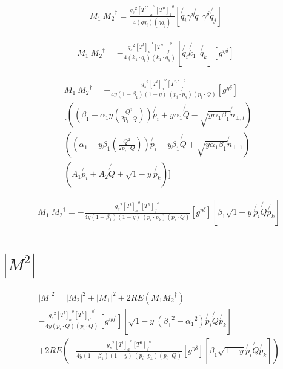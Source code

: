 \begin{equation}
\begin{split}
M_1\: {M_2}^{\dagger}=\frac{{g_s}^2 {[T^l]_a}^o {[T^n]_{f}}^{o}}{4(qq_i)(qq_j)}[\not{q_i}{\gamma}^{\eta}\not{q}\:\: {\gamma}^{{\delta}}\not{q_j}]
\end{split}
\end{equation}

\begin{equation}
\begin{split}
M_1\: {M_2}^{\dagger}=-\frac{{g_s}^2 {[T^l]_a}^o {[T^n]_{f}}^{o}}{4(k_1\cdot q_i)(k_1 \cdot q_k)}[\not{q_i}\not{k_1}\:\: \not{q_k}][{g}^{{\eta}{{\delta}}}]
\end{split}
\end{equation}

\begin{equation}
\begin{split}
&M_1\: {M_2}^{\dagger}=-\frac{{g_s}^2 {[T^l]_a}^o {[T^n]_{f}}^{o}}{4y(1-\beta_1) (1-y)\:(p_i \cdot p_k)(p_i \cdot Q)}[{g}^{{\eta}{{\delta}}}]\\
&[((\beta_1 -\alpha_1 y(\frac{Q^2}{2p_i \cdot Q}))\not{p_i} + y\alpha_1\not{Q} - \sqrt{y\alpha_1\beta_1}\not{n}_{\bot,l})\\&((\alpha_1 -y\beta_1(\frac{Q^2}{2p_i \cdot Q})) \not{p_i} + y\beta_1\not{Q} + \sqrt{y\alpha_1\beta_1}\not{n}_{\bot,1})\:\: \\
&(A_1\not{p_i} + A_2\not{Q} + \sqrt{1-y}\not{p_k})]
\end{split}
\end{equation}

\begin{equation}
\begin{split}
&M_1\: {M_2}^{\dagger}=-\frac{{g_s}^2 {[T^l]_a}^o {[T^n]_{f}}^{o}}{4y(1-\beta_1) (1-y)\:(p_i \cdot p_k)(p_i \cdot Q)}[{g}^{{\eta}{{\delta}}}][\beta_1 \sqrt{1-y}\not{p_i}\not{Q}\not{p_k}]
\end{split}
\end{equation}

\section{$|M^{2}|$}

\begin{equation}
\begin{split}
&|M|^{2}=|{M}_2|^{2}+|{M}_1|^{2}+2RE(M_1{M_2}^{\dagger})\\
&-\frac{{g_s}^2 {[T^l]_a}^o {[T^k]_{o^{\prime}}}^{a^{\prime}}}{4y(p_i \cdot Q)(p_i \cdot Q) }[g^{{\eta}{{\eta}^{\prime}}}][\sqrt{1-y}({\beta_1}^2- {\alpha_1}^2) \not{p_i}\not{Q} \not{p_k}]\\
&+2RE(-\frac{{g_s}^2 {[T^l]_a}^o {[T^n]_{f}}^{o}}{4y(1-\beta_1) (1-y)\:(p_i \cdot p_k)(p_i \cdot Q)}[{g}^{{\eta}{{\delta}}}][\beta_1 \sqrt{1-y}\not{p_i}\not{Q}\not{p_k}])
\end{split}
\end{equation}
